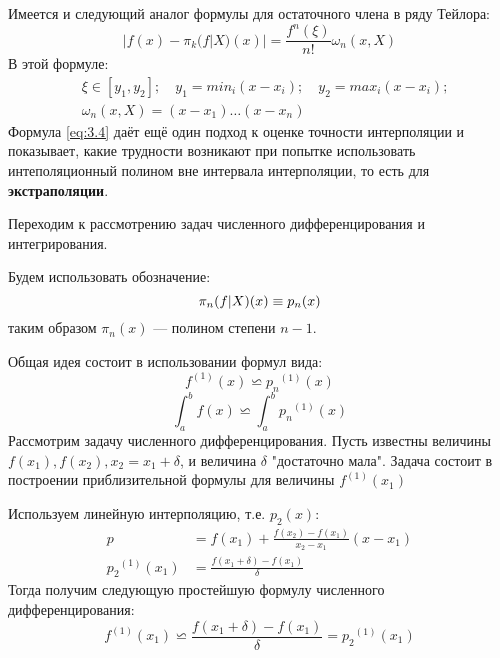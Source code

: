Имеется и следующий аналог формулы для остаточного члена в ряду Тейлора:
\begin{equation} \label{eq:3.4}
	|f(x) - \pi_k(f|X)(x)| = \frac{f^{n}(\xi)}{n!} \omega_n (x,X)
\end{equation}
В этой формуле:
\begin{equation}
\begin{aligned}
	&\xi \in [y_1, y_2]; \quad y_1=min_{i}(x-x_i); \quad y_2=max_{i}(x-x_i) ;\\ 
	&\omega_n(x, X) = (x-x_1)\dots(x-x_n)
\end{aligned}
\end{equation}
Формула \ref{eq:3.4} даёт ещё один подход к оценке точности интерполяции и показывает, какие трудности возникают при попытке использовать интеполяционный полином вне интервала интерполяции, то есть для \textbf{экстраполяции}.

\bigskip
Переходим к рассмотрению задач численного дифференцирования и интегрирования. 

Будем использовать обозначение:
\begin{equation}
	\pi_n(f|X)(x) \equiv p_n(x)\\
\end{equation}
таким образом $\pi_n(x)$ --- полином степени $n-1$.

Общая идея состоит в использовании формул вида: 
\begin{equation} \label{eq:2.8}
	f^{(1)}(x) \backsimeq {p_n}^{(1)}(x)
\end{equation}
\begin{equation}
	\int_{a}^{b}f(x) \backsimeq \int_{a}^{b}{p_n}^{(1)}(x)
\end{equation}
Рассмотрим задачу численного дифференцирования. Пусть известны величины $f(x_1), f(x_2), x_2 = x_1 + \delta$, и величина $\delta$ "достаточно мала". Задача состоит в построении приблизительной формулы для величины $f^{(1)}(x_1)$

Используем линейную интерполяцию, т.е. $p_2(x)$:
\begin{equation}
	\begin{aligned}
	p &= f(x_1) + \frac{f(x_2) - f(x_1)}{x_2-x_1}(x-x_1) \\
	{p_2}^{(1)}(x_1) &= \frac{f(x_1+\delta) - f(x_1)}{\delta}
	\end{aligned}
\end{equation}
Тогда получим следующую простейшую формулу численного дифференцирования:
\begin{dmath} \label{eq:3.10}
	f^{(1)}(x_1) \backsimeq \frac{f(x_1 + \delta) - f(x_1)}{\delta} = {p_2}^{(1)}(x_1)
\end{dmath}

